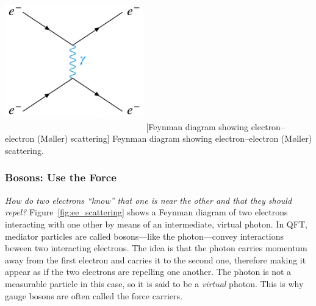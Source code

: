 \begin{multiFigure}
    \centering
    \includegraphics[width=6cm,height=6cm,keepaspectratio]{figures/sm/ee_scattering_moeller.png}
    [Feynman diagram showing electron--electron (Møller) scattering]
    {Feynman diagram showing electron--electron (Møller) scattering.} 
    \label{fig:ee_scattering}
\end{multiFigure}
\subsubsection{Bosons: Use the Force}

\emph{How do two electrons ``know'' that one is near the other and that they should repel?}
Figure~\ref{fig:ee_scattering} shows a Feynman diagram of two electrons interacting with one other by means of an intermediate, virtual photon.
In QFT, mediator particles are called bosons---like the photon---convey interactions beween two interacting electrons.
The idea is that the photon carries momentum away from the first electron and carries it to the second one, therefore making it appear as if the two electrons are repelling one another.
The photon is not a measurable particle in this case, so it is said to be a \emph{virtual} photon.
This is why gauge bosons are often called the force carriers.

